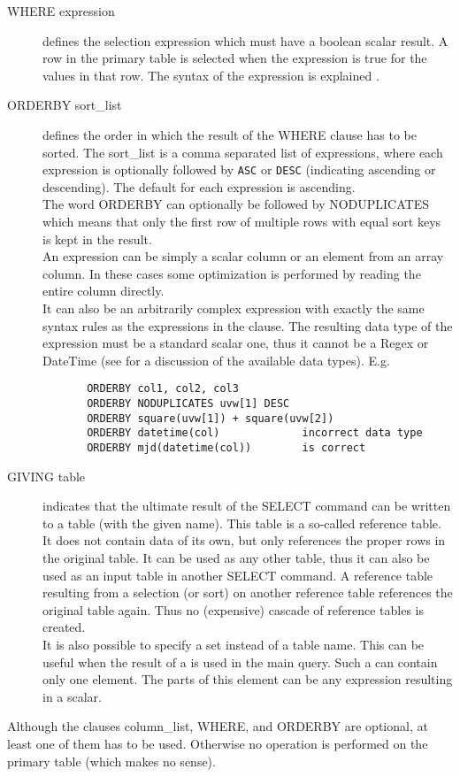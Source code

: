 \begin{description}
  \item[WHERE expression]
       defines the selection expression which must have a boolean
       scalar result. A row in the primary table
       is selected when the expression is true for the values in that row.
       The syntax of the expression is explained
       .
  \item[ORDERBY sort\_list]
       defines the order in which the result of the WHERE clause
       has to be sorted. The sort\_list is a comma separated list of
       expressions, where each expression is
       optionally followed by \texttt{ASC} or \texttt{DESC}
       (indicating ascending or descending). The default for each
       expression is ascending.
       \\The word ORDERBY can optionally be followed by NODUPLICATES
       which means that only the first row of multiple rows with
       equal sort keys is kept in the result.
       \\An expression can be simply a scalar column or an element from
       an array column. In these cases some optimization is performed
       by reading the entire column directly.
       \\It can also be an arbitrarily complex expression
       with exactly the same syntax rules as the expressions in the
        clause.
       The resulting data type of the expression must
       be a standard scalar one, thus it cannot be a Regex or
       DateTime (see  for a discussion
       of the available data types).
       E.g.
       \begin{verbatim}
       ORDERBY col1, col2, col3
       ORDERBY NODUPLICATES uvw[1] DESC
       ORDERBY square(uvw[1]) + square(uvw[2])
       ORDERBY datetime(col)             incorrect data type
       ORDERBY mjd(datetime(col))        is correct
       \end{verbatim}
  \item[ \label{TAQL:GIVING}GIVING table ]
       indicates that the ultimate result of the SELECT command can be
       written to a table (with the given name). This table is a
       so-called reference table.
       It does not contain data of its own, but only references the
       proper rows in the original table. It can be used
       as any other table, thus it can also be used as an input table in
       another SELECT command. A reference table resulting from
       a selection (or sort) on another reference table references the
       original table again. Thus no (expensive) cascade of reference
       tables is created.
       \\It is also possible to specify a set instead of a table name.
       This can be useful when the result of a
        is used in the main query.
       Such a  can contain only one element.
       The parts of this element can be any expression resulting in a scalar.
\end{description}
Although the clauses column\_list, WHERE, and ORDERBY are optional,
at least one of them has to be used. Otherwise no operation is
performed on the primary table (which makes no sense).


